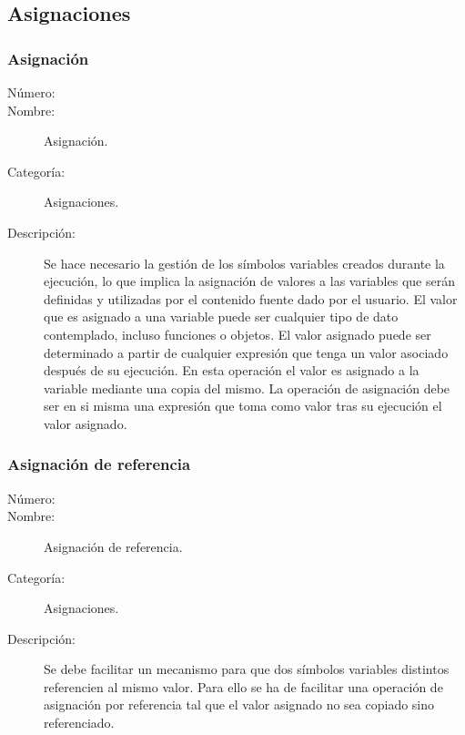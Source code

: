 \subsection{Asignaciones}
\subsubsection{Asignación}
\begin{framed}
	\begin{description}
		\item [Número:] \cn
		\item [Nombre:] Asignación.
		\item [Categoría:] Asignaciones.
		\item [Descripción:] Se hace necesario la gestión de los símbolos variables creados durante la ejecución, lo que implica
		la asignación de valores a las variables que serán definidas y utilizadas por el contenido fuente dado por el usuario.
		El valor que es asignado a una variable puede ser cualquier tipo de dato contemplado, incluso funciones o objetos. El valor asignado
		puede ser determinado a partir de cualquier expresión que tenga un valor asociado después de su ejecución. En esta operación el
		valor es asignado a la variable mediante una copia del mismo. La operación de asignación debe ser en si misma una expresión que toma como
		valor tras su ejecución el valor asignado.
	\end {description}
\end{framed}

\subsubsection{Asignación de referencia}
\begin{framed}
	\begin{description}
		\item [Número:] \cn
		\item [Nombre:] Asignación de referencia.
		\item [Categoría:] Asignaciones.
		\item [Descripción:] Se debe facilitar un mecanismo para que dos símbolos variables distintos referencien al mismo valor.
		Para ello se ha de facilitar una operación de asignación por referencia tal que el valor asignado no sea copiado sino referenciado.
	\end {description}
\end{framed}
